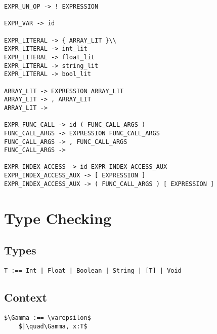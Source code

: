 \documentclass[11pt, a4paper]{article}
\begin{document}
\begin{lstlisting}
EXPR_UN_OP -> ! EXPRESSION

EXPR_VAR -> id

EXPR_LITERAL -> { ARRAY_LIT }\\
EXPR_LITERAL -> int_lit
EXPR_LITERAL -> float_lit
EXPR_LITERAL -> string_lit
EXPR_LITERAL -> bool_lit

ARRAY_LIT -> EXPRESSION ARRAY_LIT
ARRAY_LIT -> , ARRAY_LIT
ARRAY_LIT -> 

EXPR_FUNC_CALL -> id ( FUNC_CALL_ARGS )
FUNC_CALL_ARGS -> EXPRESSION FUNC_CALL_ARGS
FUNC_CALL_ARGS -> , FUNC_CALL_ARGS
FUNC_CALL_ARGS -> 

EXPR_INDEX_ACCESS -> id EXPR_INDEX_ACCESS_AUX
EXPR_INDEX_ACCESS_AUX -> [ EXPRESSION ]
EXPR_INDEX_ACCESS_AUX -> ( FUNC_CALL_ARGS ) [ EXPRESSION ]

\end{lstlisting}
\section{Type Checking}
\subsection*{Types}
\begin{lstlisting}
T :== Int | Float | Boolean | String | [T] | Void
\end{lstlisting}
\subsection*{Context}
\begin{lstlisting}
$\Gamma :== \varepsilon$
    $|\quad\Gamma, x:T$
\end{lstlisting}
\end{document}
